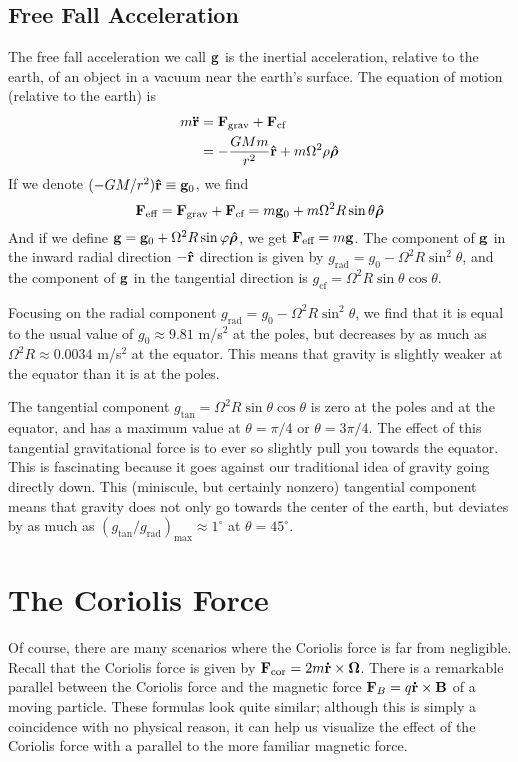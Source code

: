 \subsection*{Free Fall Acceleration}
The free fall acceleration we call $\mathbf{g}$ is the inertial acceleration, relative to the earth, of an object in a vacuum near the earth's surface. The equation of motion (relative to the earth) is
\begin{align*}
    m\mathbf{\ddot r} &= \mathbf{F}_\text{grav} + \mathbf{F}_\text{cf} \\
    &= -\frac{GMm}{r^2}\mathbf{\hat{r}} + m\Omega^2\rho\boldsymbol{\hat\rho}
\end{align*}
If we denote $(-GM/r^2)\mathbf{\hat{r}} \equiv \mathbf{g}_0$, we find
\[ \mathbf{F}_\text{eff} = \mathbf{F}_\text{grav} + \mathbf{F}_\text{cf} = m\mathbf{g}_0 + m\Omega^2 R\sin\theta\boldsymbol{\hat\rho} \]
And if we define $\mathbf{g} = \mathbf{g}_0 + \Omega^2R\sin\varphi \boldsymbol{\hat\rho}$, we get $\mathbf{F}_\text{eff} = m\mathbf{g}$. The component of $\mathbf{g}$ in the inward radial direction $-\mathbf{\hat{r}}$ direction is given by $g_\text{rad} = g_0 - \Omega^2R\sin^2\theta $, and the component of $\mathbf{g}$ in the tangential direction is $g_\text{cf} = \Omega^2R\sin\theta\cos\theta$.

Focusing on the radial component $g_\text{rad} = g_0 - \Omega^2R\sin^2\theta$, we find that it is equal to the usual value of $g_0 \approx 9.81$ m/s$^2$ at the poles, but decreases by as much as $\Omega^2R \approx 0.0034$ m/s$^2$ at the equator. This means that gravity is slightly weaker at the equator than it is at the poles.

The tangential component $g_\text{tan} = \Omega^2R\sin\theta\cos\theta$ is zero at the poles and at the equator, and has a maximum value at $\theta = \pi/4$ or $\theta = 3\pi/4$. The effect of this tangential gravitational force is to ever so slightly pull you towards the equator. This is fascinating because it goes against our traditional idea of gravity going directly down. This (miniscule, but certainly nonzero) tangential component means that gravity does not only go towards the center of the earth, but deviates by as much as $(g_\text{tan}/g_\text{rad})_\text{max} \approx 1^\circ$ at $\theta=45^\circ$.
\section{The Coriolis Force}
Of course, there are many scenarios where the Coriolis force is far from negligible. Recall that the Coriolis force is given by $\mathbf{F}_\text{cor} = 2m\mathbf{\dot r}\times \boldsymbol{\Omega}$. There is a remarkable parallel between the Coriolis force and the magnetic force $\mathbf{F}_B = q\mathbf{\dot r}\times\mathbf{B}$ of a moving particle. These formulas look quite similar; although this is simply a coincidence with no physical reason, it can help us visualize the effect of the Coriolis force with a parallel to the more familiar magnetic force. 

